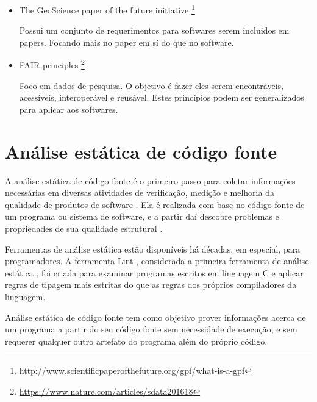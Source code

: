\begin{itemize}
  \item The GeoScience paper of the future initiative \cite{OntoSoft2016}\footnote{\url{http://www.scientificpaperofthefuture.org/gpf/what-is-a-gpf}}

    Possui um conjunto de requerimentos para softwares serem incluidos em
    papers.  Focando mais no paper em sí do que no software.

  \item FAIR principles \cite{wilkinson2016fair}\footnote{\url{https://www.nature.com/articles/sdata201618}}

    Foco em dados de pesquisa. O objetivo é fazer eles serem encontráveis,
    acessíveis, interoperável e reusável. Estes princípios podem ser
    generalizados para aplicar aos softwares.

\end{itemize}

\section{Análise estática de código fonte} \label{analise-estatica}

A análise estática de código fonte é o primeiro passo para coletar informações
necessárias em diversas atividades de verificação, medição e melhoria da
qualidade de produtos de software \cite{Cruz2009, Kirkov2010}. Ela é
realizada com base no código fonte de um programa ou sistema de software, e a
partir daí descobre problemas e propriedades de sua qualidade estrutural
\cite{Chess2007}.

Ferramentas de análise estática estão disponíveis há décadas, em especial,
para programadores. A ferramenta Lint \cite{Johnson1978}, considerada a
primeira ferramenta de análise estática \cite{Gosain2015}, foi criada para
examinar programas escritos em linguagem C e aplicar regras de tipagem mais
estritas do que as regras dos próprios compiladores da linguagem.

%

Análise estática de código fonte tem como objetivo prover
informações acerca de um programa a partir do seu código fonte sem
necessidade de execução, e sem requerer qualquer outro artefato do programa
além do próprio código.

